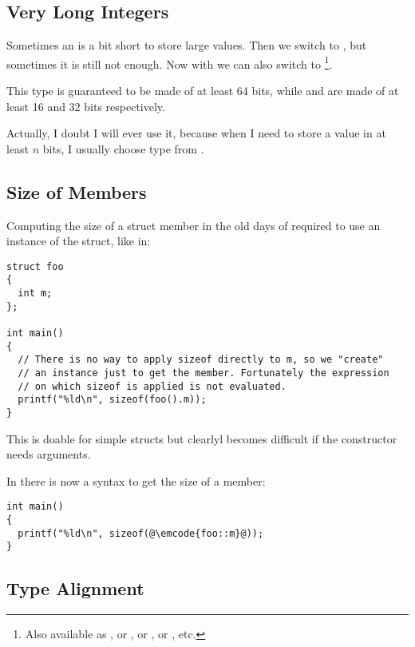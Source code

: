 \subsection{Very Long Integers}

Sometimes an  is a bit short to store large values. Then we
switch to , but sometimes it is still not enough. Now
with  we can also switch to \footnote{Also
available as , or ,
or , or , etc.}.

This type is guaranteed to be made of at least 64 bits,
while  and  are made of at least 16 and 32
bits respectively.

Actually, I doubt I will ever use it, because when I need to store a
value in at least $n$ bits, I usually choose  type
from .

\subsection{Size of Members}

Computing the size of a struct member in the old days of \cpp{}
required to use an instance of the struct, like in:

\begin{lstlisting}
struct foo
{
  int m;
};

int main()
{
  // There is no way to apply sizeof directly to m, so we "create"
  // an instance just to get the member. Fortunately the expression
  // on which sizeof is applied is not evaluated.
  printf("%ld\n", sizeof(foo().m));
}
\end{lstlisting}

This is doable for simple structs but clearlyl becomes difficult if
the constructor needs arguments.

In  there is now a syntax to get the size of a member:

\begin{lstlisting}
int main()
{
  printf("%ld\n", sizeof(@\emcode{foo::m}@));
}
\end{lstlisting}

\subsection{Type Alignment}


